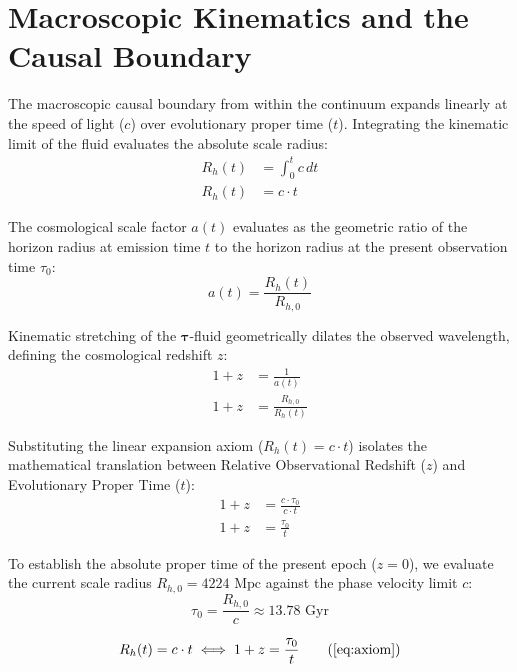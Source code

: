 \documentclass[11pt, a4paper]{article}
\begin{document}
\section{Macroscopic Kinematics and the Causal Boundary}
\label{sec:deriv_axiom}
The macroscopic causal boundary from within the continuum expands linearly at the speed of light ($c$) over evolutionary proper time ($t$). Integrating the kinematic limit of the fluid evaluates the absolute scale radius:
\begin{align}
    R_h(t) &= \int_{0}^{t} c \, dt \\
    R_h(t) &= c \cdot t
\end{align}

The cosmological scale factor $a(t)$ evaluates as the geometric ratio of the horizon radius at emission time $t$ to the horizon radius at the present observation time $\tau_0$:
\begin{equation}
    a(t) = \frac{R_h(t)}{R_{h,0}}
\end{equation}

Kinematic stretching of the $\boldsymbol{\tau}$-fluid geometrically dilates the observed wavelength, defining the cosmological redshift $z$:
\begin{align}
    1 + z &= \frac{1}{a(t)} \\
    1 + z &= \frac{R_{h,0}}{R_h(t)}
\end{align}

Substituting the linear expansion axiom ($R_h(t) = c \cdot t$)  isolates the mathematical translation between Relative Observational Redshift ($z$) and Evolutionary Proper Time ($t$):
\begin{align}
    1 + z &= \frac{c \cdot \tau_0}{c \cdot t} \\
    1+z &= \frac{\tau_0}{t}
\end{align}

To establish the absolute proper time of the present epoch ($z=0$), we evaluate the current scale radius $R_{h,0} = 4224 \text{ Mpc}$ against the phase velocity limit $c$:
\begin{equation}
    \tau_0 = \frac{R_{h,0}}{c} \approx 13.78 \text{ Gyr}
\end{equation}

\begin{tcolorbox}[recallbox, title={\ref{box:axiom}. Fundamental Axiom \& Translation}]
\begin{equation}
    R_h(t) = c \cdot t \iff 1+z = \frac{\tau_0}{t} \tag{\ref{eq:axiom}}
\end{equation}
\end{tcolorbox}
\end{document}
